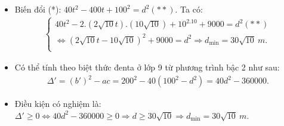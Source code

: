 \begin{vidu}
{{}{}
\begin{itemize}
\item[c)] 	Biến đổi (*): $40t^2-400t+100^2=d^2\left(**\right)$. Ta có:
\begin{align*}
\begin{cases}
40t^2-2.\left(2\sqrt{10}t\right).\left(10\sqrt{10}\right)+10^2.10+9000=d^2\left(**\right)\\
\Leftrightarrow {\left(2\sqrt{10}t-10\sqrt{10}\right)}^2+9000=d^2\Rightarrow d_{\min}=30\sqrt{10}\ m.\\
\end{cases}
\end{align*}
\end{itemize}
\begin{note}
\begin{itemize}
\item[$\bullet$] Có thể tính theo biệt thức đenta ở lớp 9 từ phương trình bậc 2 như sau:
\begin{align*}
{\Delta}'={\left(b'\right)}^2-ac=200^2-40\left(100^2-d^2\right)=40d^2-360000.
\end{align*}
\item[$\bullet$] Điều kiện có nghiệm là: ${\Delta}'\ge 0\Leftrightarrow 40d^2-360000\ge 0\Rightarrow d\ge 30\sqrt{10}\Rightarrow d_{\min}=30\sqrt{10}\ m$.
\end{itemize}	
\end{note}	
}
\end{vidu}









